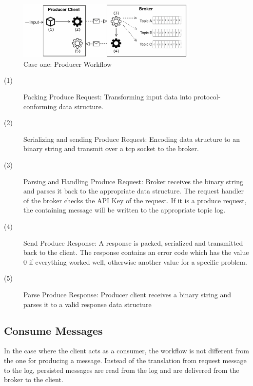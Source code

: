 \begin{figure}[H]
    \centering
    \includegraphics[width=0.8\textwidth]{images/concept_producer.png}
    \caption{Case one: Producer Workflow}
    \label{fig:conept-producer}
\end{figure}

\begin{description}
    \item [(1)] 
        {Packing Produce Request: Transforming input data into protocol-conforming data structure.}
    \item [(2)] 
        {Serializing and sending Produce Request: Encoding data structure to an
            binary  string and transmit over a tcp socket to the broker.}
    \item [(3)] 
        {Parsing and Handling Produce Request: Broker receives the binary string
            and parses it back to the appropriate data structure. The request
            handler of the  broker checks the API Key of the request. If it is a
            produce request, the containing message will be written to the
            appropriate topic log.}
    \item [(4)] 
        {Send Produce Response: A response is packed, serialized and transmitted
            back to the client. The response contains an error code which has
            the value 0 if everything worked well, otherwise another value for a
            specific problem. }
    \item [(5)] 
        {Parse Produce Response: Producer client receives a binary string and
            parses it to a valid response data structure }
\end{description}

\subsection{Consume Messages}

In the case where the client acts as a consumer, the workflow is not different from the one for
producing a message. Instead of the translation from request message to the log, persisted messages
are read from the log and are delivered from the broker to the client.

